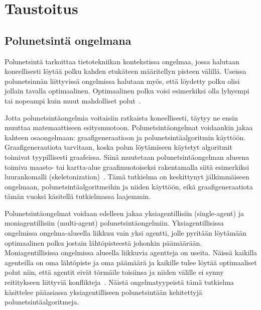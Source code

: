 \chapter{Taustoitus} \label{Taustoitus}

\section{Polunetsintä ongelmana}\label{pOngelmana}
Polunetsintä tarkoittaa tietotekniikan kontekstissa ongelmaa, jossa halutaan 
koneellisesti löytää polku kahden etukäteen määritellyn pisteen välillä. 
Useissa polunetsinnän liittyvissä ongelmissa halutaan myös, että löydetty 
polku olisi jollain tavalla optimaalinen. Optimaalinen polku voisi 
esimerkiksi olla lyhyempi tai nopeampi kuin muut mahdolliset 
polut~\cite{MathewAndMalathy}.\par
	Jotta polunetsintäongelmia voitaisiin ratkaista koneellisesti, 
täytyy ne ensin muuttaa matemaattiseen esitysmuotoon. Polunetsintäongelmat 
voidaankin jakaa kahteen osaongelmaan: graafigeneraatioon ja 
polunetsintäalgoritmin käyttöön. Graafigeneraatiota tarvitaan, koska polun 
löytämiseen käytetyt algoritmit toimivat tyypillisesti graafeissa. Siinä 
muutetaan polunetsintäongelman alueena toimiva maasto- tai kartta-alue 
graafimuotoiseksi rakentamalla siitä esimerkiksi luurankomalli 
(skeletonization)~\cite{ACMHindawi}. Tämä tutkielma on keskittynyt 
jälkimmäiseen ongelmaan, polunetsintäalgoritmeihin ja niiden käyttöön, eikä 
graafigeneraatiota tämän vuoksi käsitellä tutkielmassa laajemmin. \par
	Polunetsintäongelmat voidaan edelleen jakaa yksiagentillisiin 
(single-agent) ja moniagentillisiin (multi-agent) polunetsintäongelmiin. 
Yksiagentillisissa ongelmissa ongelma-alueella liikkuu vain yksi agentti, 
jolle pyritään löytämään optimaalinen polku jostain lähtöpisteestä johonkin 
päämäärään. Moniagentillisissa ongelmissa alueella liikkuvia agentteja on 
useita. Näissä kaikilla agenteilla on oma lähtöpiste ja oma päämäärä ja 
kaikille tulee löytää optimaaliset polut niin, että agentit eivät törmäile 
toisiinsa ja niiden välille ei synny reititykseen liittyviä 
konflikteja~\cite{arXivMAPF}. Näistä ongelmatyypeistä tämä tutkielma käsittelee 
pääasiassa yksiagentilliseen polunetsintään kehitettyjä 
polunetsintäalgoritmeja.

